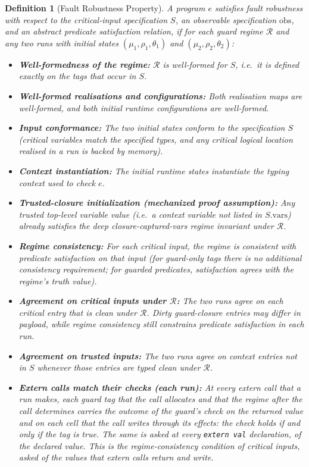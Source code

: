 \documentclass[12pt]{article}
\newtheorem{definition}{Definition}[section]
\begin{document}
\begin{definition}[Fault Robustness Property]
A program $e$ satisfies fault robustness with respect to the critical-input specification $S$, an observable specification $\text{obs}$, and an abstract predicate satisfaction relation, if for each guard regime $\mathcal{R}$ and any two runs with initial states $(\mu_1,\rho_1,\theta_1)$ and $(\mu_2,\rho_2,\theta_2)$:
\begin{itemize}
    \item \textbf{Well-formedness of the regime:} $\mathcal{R}$ is well-formed for $S$, i.e.\ it is defined exactly on the tags that occur in $S$.
    \item \textbf{Well-formed realisations and configurations:} Both realisation maps are well-formed, and both initial runtime configurations are well-formed.
    \item \textbf{Input conformance:} The two initial states conform to the specification $S$ (critical variables match the specified types, and any critical logical location realised in a run is backed by memory).
    \item \textbf{Context instantiation:} The initial runtime states instantiate the typing context used to check $e$.
    \item \textbf{Trusted-closure initialization (mechanized proof assumption):} Any trusted top-level variable value (i.e.\ a context variable not listed in $S.\mathrm{vars}$) already satisfies the deep closure-captured-vars regime invariant under $\mathcal{R}$.
    \item \textbf{Regime consistency:} For each critical input, the regime is consistent with predicate satisfaction on that input (for guard-only tags there is no additional consistency requirement; for guarded predicates, satisfaction agrees with the regime's truth value).
    \item \textbf{Agreement on critical inputs under $\mathcal{R}$:} The two runs agree on each critical entry that is clean under $\mathcal{R}$. Dirty guard-closure entries may differ in payload, while regime consistency still constrains predicate satisfaction in each run.
    \item \textbf{Agreement on trusted inputs:} The two runs agree on context entries not in $S$ whenever those entries are typed clean under $\mathcal{R}$.
    \item \textbf{Extern calls match their checks (each run):} At every extern call that a run makes, each guard tag that the call allocates and that the regime after the call determines carries the outcome of the guard's check on the returned value and on each cell that the call writes through its effects: the check holds if and only if the tag is true. The same is asked at every \texttt{extern val} declaration, of the declared value. This is the regime-consistency condition of critical inputs, asked of the values that extern calls return and write.

\end{itemize}
\end{definition}
\end{document}
